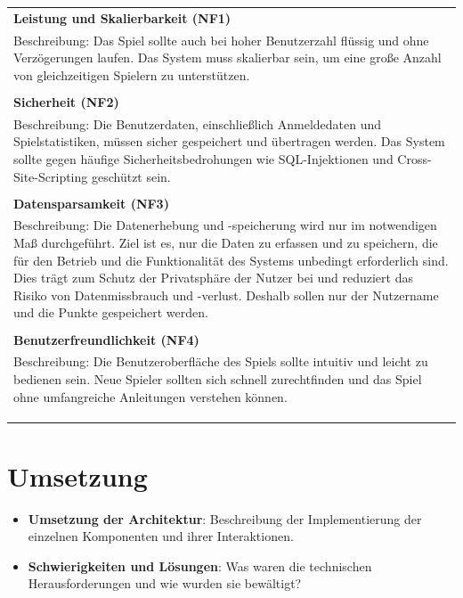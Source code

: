 \documentclass[
]{article}
\begin{document}
\begin{center}
  \begin{tabular}{|p{\linewidth}|}
    \hline
    \textbf{Leistung und Skalierbarkeit (NF1)} \\
    Beschreibung: Das Spiel sollte auch bei hoher Benutzerzahl flüssig und ohne Verzögerungen laufen. Das System muss skalierbar sein, um eine große Anzahl von gleichzeitigen Spielern zu unterstützen. \\ \\
    \hline
    \textbf{Sicherheit (NF2)} \\
    Beschreibung: Die Benutzerdaten, einschließlich Anmeldedaten und Spielstatistiken, müssen sicher gespeichert und übertragen werden. Das System sollte gegen häufige Sicherheitsbedrohungen wie SQL-Injektionen und Cross-Site-Scripting geschützt sein.\\ \\
    \hline
    \textbf{Datensparsamkeit (NF3)} \\
     Beschreibung:
     Die Datenerhebung und -speicherung wird nur im notwendigen Maß durchgeführt. 
     Ziel ist es, nur die Daten zu erfassen und zu speichern, die für den Betrieb und die Funktionalität des Systems unbedingt erforderlich sind. 
     Dies trägt zum Schutz der Privatsphäre der Nutzer bei und reduziert das Risiko von Datenmissbrauch und -verlust.
     Deshalb sollen nur der Nutzername und die Punkte gespeichert werden.
    \\ \\
    \hline
    \textbf{Benutzerfreundlichkeit (NF4)} \\
    Beschreibung: Die Benutzeroberfläche des Spiels sollte intuitiv und leicht zu bedienen sein. Neue Spieler sollten sich schnell zurechtfinden und das Spiel ohne umfangreiche Anleitungen verstehen können.\\ \\
    \\ \\
    \hline
  \end{tabular}
\end{center}

\section{Umsetzung}

\begin{itemize}
    \item \textbf{Umsetzung der Architektur}: Beschreibung der Implementierung der einzelnen Komponenten und ihrer Interaktionen.
    \item \textbf{Schwierigkeiten und Lösungen}: Was waren die technischen Herausforderungen und wie wurden sie bewältigt?
\end{itemize}
\end{document}
